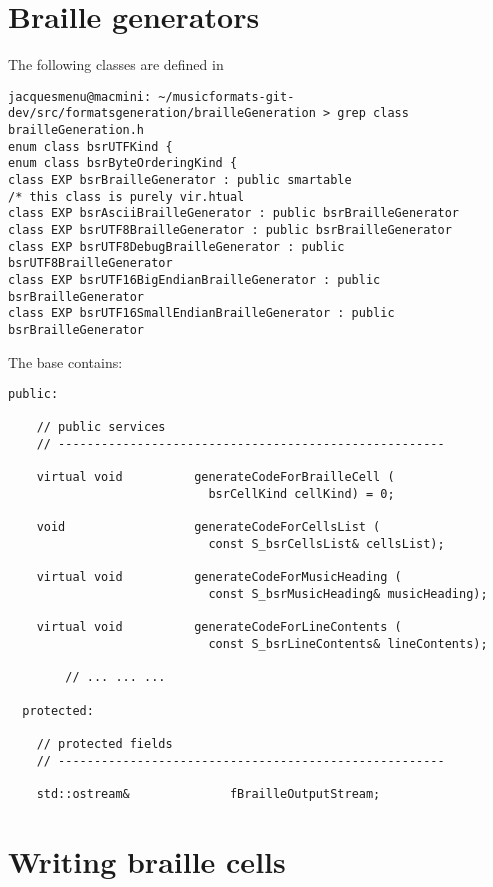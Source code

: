 \section{Braille generators}

The following classes are defined in 
\begin{lstlisting}[language=Terminal]
jacquesmenu@macmini: ~/musicformats-git-dev/src/formatsgeneration/brailleGeneration > grep class   brailleGeneration.h
enum class bsrUTFKind {
enum class bsrByteOrderingKind {
class EXP bsrBrailleGenerator : public smartable
/* this class is purely vir.htual
class EXP bsrAsciiBrailleGenerator : public bsrBrailleGenerator
class EXP bsrUTF8BrailleGenerator : public bsrBrailleGenerator
class EXP bsrUTF8DebugBrailleGenerator : public bsrUTF8BrailleGenerator
class EXP bsrUTF16BigEndianBrailleGenerator : public bsrBrailleGenerator
class EXP bsrUTF16SmallEndianBrailleGenerator : public bsrBrailleGenerator
\end{lstlisting}

The base  contains:
\begin{lstlisting}[language=CPlusPlus]
  public:

    // public services
    // ------------------------------------------------------

    virtual void          generateCodeForBrailleCell (
                            bsrCellKind cellKind) = 0;

    void                  generateCodeForCellsList (
                            const S_bsrCellsList& cellsList);

    virtual void          generateCodeForMusicHeading (
                            const S_bsrMusicHeading& musicHeading);

    virtual void          generateCodeForLineContents (
                            const S_bsrLineContents& lineContents);

		// ... ... ...

  protected:

    // protected fields
    // ------------------------------------------------------

    std::ostream&              fBrailleOutputStream;
\end{lstlisting}


\section{Writing braille cells}

